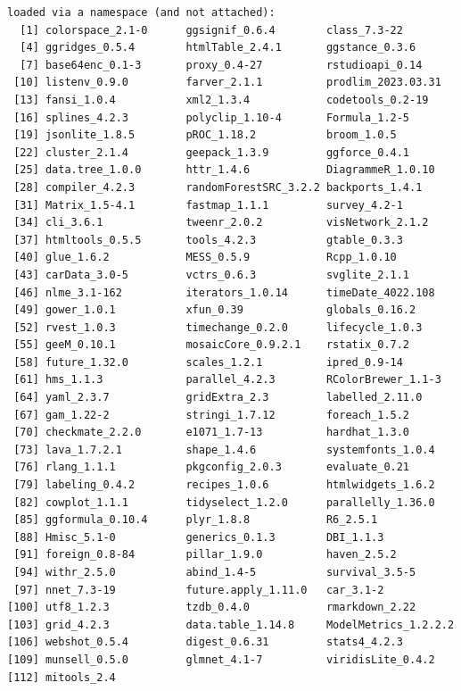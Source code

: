 \documentclass[
  letterpaper,
  DIV=11,
  numbers=noendperiod]{scrreprt}
\begin{document}
\begin{verbatim}
loaded via a namespace (and not attached):
  [1] colorspace_2.1-0      ggsignif_0.6.4        class_7.3-22         
  [4] ggridges_0.5.4        htmlTable_2.4.1       ggstance_0.3.6       
  [7] base64enc_0.1-3       proxy_0.4-27          rstudioapi_0.14      
 [10] listenv_0.9.0         farver_2.1.1          prodlim_2023.03.31   
 [13] fansi_1.0.4           xml2_1.3.4            codetools_0.2-19     
 [16] splines_4.2.3         polyclip_1.10-4       Formula_1.2-5        
 [19] jsonlite_1.8.5        pROC_1.18.2           broom_1.0.5          
 [22] cluster_2.1.4         geepack_1.3.9         ggforce_0.4.1        
 [25] data.tree_1.0.0       httr_1.4.6            DiagrammeR_1.0.10    
 [28] compiler_4.2.3        randomForestSRC_3.2.2 backports_1.4.1      
 [31] Matrix_1.5-4.1        fastmap_1.1.1         survey_4.2-1         
 [34] cli_3.6.1             tweenr_2.0.2          visNetwork_2.1.2     
 [37] htmltools_0.5.5       tools_4.2.3           gtable_0.3.3         
 [40] glue_1.6.2            MESS_0.5.9            Rcpp_1.0.10          
 [43] carData_3.0-5         vctrs_0.6.3           svglite_2.1.1        
 [46] nlme_3.1-162          iterators_1.0.14      timeDate_4022.108    
 [49] gower_1.0.1           xfun_0.39             globals_0.16.2       
 [52] rvest_1.0.3           timechange_0.2.0      lifecycle_1.0.3      
 [55] geeM_0.10.1           mosaicCore_0.9.2.1    rstatix_0.7.2        
 [58] future_1.32.0         scales_1.2.1          ipred_0.9-14         
 [61] hms_1.1.3             parallel_4.2.3        RColorBrewer_1.1-3   
 [64] yaml_2.3.7            gridExtra_2.3         labelled_2.11.0      
 [67] gam_1.22-2            stringi_1.7.12        foreach_1.5.2        
 [70] checkmate_2.2.0       e1071_1.7-13          hardhat_1.3.0        
 [73] lava_1.7.2.1          shape_1.4.6           systemfonts_1.0.4    
 [76] rlang_1.1.1           pkgconfig_2.0.3       evaluate_0.21        
 [79] labeling_0.4.2        recipes_1.0.6         htmlwidgets_1.6.2    
 [82] cowplot_1.1.1         tidyselect_1.2.0      parallelly_1.36.0    
 [85] ggformula_0.10.4      plyr_1.8.8            R6_2.5.1             
 [88] Hmisc_5.1-0           generics_0.1.3        DBI_1.1.3            
 [91] foreign_0.8-84        pillar_1.9.0          haven_2.5.2          
 [94] withr_2.5.0           abind_1.4-5           survival_3.5-5       
 [97] nnet_7.3-19           future.apply_1.11.0   car_3.1-2            
[100] utf8_1.2.3            tzdb_0.4.0            rmarkdown_2.22       
[103] grid_4.2.3            data.table_1.14.8     ModelMetrics_1.2.2.2 
[106] webshot_0.5.4         digest_0.6.31         stats4_4.2.3         
[109] munsell_0.5.0         glmnet_4.1-7          viridisLite_0.4.2    
[112] mitools_2.4          
\end{verbatim}
\end{document}

